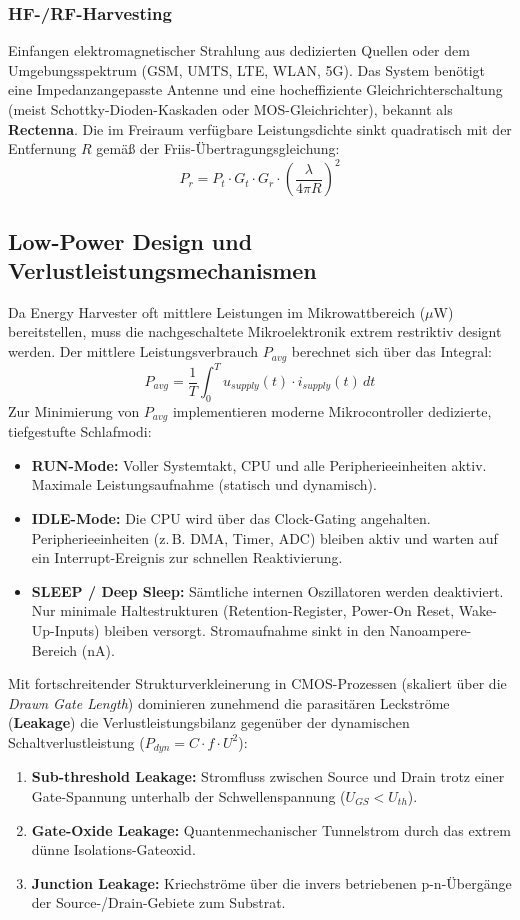 \documentclass[8pt,a4paper]{article}
\begin{document}
\subsubsection{HF-/RF-Harvesting}
Einfangen elektromagnetischer Strahlung aus dedizierten Quellen oder dem Umgebungsspektrum (GSM, UMTS, LTE, WLAN, 5G). Das System benötigt eine Impedanzangepasste Antenne und eine hocheffiziente Gleichrichterschaltung (meist Schottky-Dioden-Kaskaden oder MOS-Gleichrichter), bekannt als \textbf{Rectenna}. Die im Freiraum verfügbare Leistungsdichte sinkt quadratisch mit der Entfernung $R$ gemäß der Friis-Übertragungsgleichung:
\begin{equation}
    P_r = P_t \cdot G_t \cdot G_r \cdot \left( \frac{\lambda}{4\pi R} \right)^2
\end{equation}

\subsection{Low-Power Design und Verlustleistungsmechanismen}
Da Energy Harvester oft mittlere Leistungen im Mikrowattbereich ($\mu$W) bereitstellen, muss die nachgeschaltete Mikroelektronik extrem restriktiv designt werden. Der mittlere Leistungsverbrauch $P_{avg}$ berechnet sich über das Integral:
\begin{equation}
    P_{avg} = \frac{1}{T} \int_{0}^{T} u_{supply}(t) \cdot i_{supply}(t) \, dt
\end{equation}
Zur Minimierung von $P_{avg}$ implementieren moderne Mikrocontroller dedizierte, tiefgestufte Schlafmodi:
\begin{itemize}
    \item \textbf{RUN-Mode:} Voller Systemtakt, CPU und alle Peripherieeinheiten aktiv. Maximale Leistungsaufnahme (statisch und dynamisch).
    \item \textbf{IDLE-Mode:} Die CPU wird über das Clock-Gating angehalten. Peripherieeinheiten (z.\,B. DMA, Timer, ADC) bleiben aktiv und warten auf ein Interrupt-Ereignis zur schnellen Reaktivierung.
    \item \textbf{SLEEP / Deep Sleep:} Sämtliche internen Oszillatoren werden deaktiviert. Nur minimale Haltestrukturen (Retention-Register, Power-On Reset, Wake-Up-Inputs) bleiben versorgt. Stromaufnahme sinkt in den Nanoampere-Bereich (nA).
\end{itemize}
Mit fortschreitender Strukturverkleinerung in CMOS-Prozessen (skaliert über die \textit{Drawn Gate Length}) dominieren zunehmend die parasitären Leckströme (\textbf{Leakage}) die Verlustleistungsbilanz gegenüber der dynamischen Schaltverlustleistung ($P_{dyn} = C \cdot f \cdot U^2$):
\begin{enumerate}
    \item \textbf{Sub-threshold Leakage:} Stromfluss zwischen Source und Drain trotz einer Gate-Spannung unterhalb der Schwellenspannung ($U_{GS} < U_{th}$).
    \item \textbf{Gate-Oxide Leakage:} Quantenmechanischer Tunnelstrom durch das extrem dünne Isolations-Gateoxid.
    \item \textbf{Junction Leakage:} Kriechströme über die invers betriebenen p-n-Übergänge der Source-/Drain-Gebiete zum Substrat.
\end{enumerate}
\end{document}
